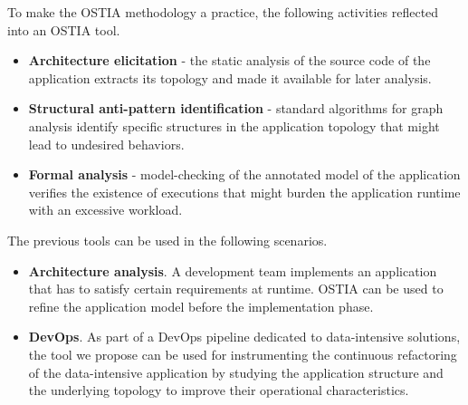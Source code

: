 {To make the OSTIA methodology a practice, the following activities reflected into an OSTIA tool.
\begin{itemize}
	\item \textbf{Architecture elicitation} - the static analysis of the source code of the application extracts its topology and made it available for later analysis.
	\item \textbf{Structural anti-pattern identification} - standard algorithms for graph analysis identify specific structures in the application topology that might lead to undesired behaviors.
	\item \textbf{Formal analysis} - model-checking of the annotated model of the application verifies the existence of executions that might burden the application runtime with an excessive workload.
\end{itemize}

\noindent
The previous tools can be used in the following scenarios.
\begin{itemize}
	\item \textbf{Architecture analysis}. A development team implements an application that has to satisfy certain requirements at runtime. OSTIA can be used to refine the application model before the implementation phase.
	\item \textbf{DevOps}. As part of a DevOps pipeline dedicated to data-intensive solutions, the tool we propose can be used for instrumenting the continuous refactoring of the data-intensive application by studying the application structure and the underlying topology to improve their operational characteristics.
\end{itemize}
}